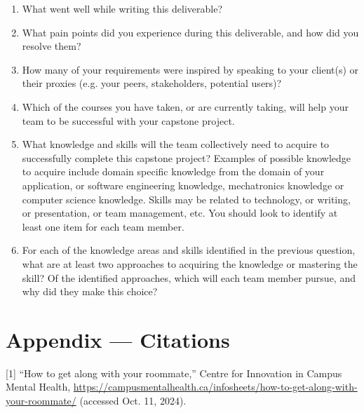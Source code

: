 \documentclass{scrreprt}
\theoremstyle{definition}
\begin{document}
\begin{enumerate}
  \item What went well while writing this deliverable? 
  \item What pain points did you experience during this deliverable, and how did
  you resolve them?
  \item How many of your requirements were inspired by speaking to your
  client(s) or their proxies (e.g. your peers, stakeholders, potential users)?
  \item Which of the courses you have taken, or are currently taking, will help
  your team to be successful with your capstone project.
  \item What knowledge and skills will the team collectively need to acquire to
  successfully complete this capstone project?  Examples of possible knowledge
  to acquire include domain specific knowledge from the domain of your
  application, or software engineering knowledge, mechatronics knowledge or
  computer science knowledge.  Skills may be related to technology, or writing,
  or presentation, or team management, etc.  You should look to identify at
  least one item for each team member.
  \item For each of the knowledge areas and skills identified in the previous
  question, what are at least two approaches to acquiring the knowledge or
  mastering the skill?  Of the identified approaches, which will each team
  member pursue, and why did they make this choice?
\end{enumerate}

\newpage{}
\section*{Appendix --- Citations}
[1] “How to get along with your roommate,” Centre for Innovation in Campus Mental Health, \href{https://campusmentalhealth.ca/infosheets/how-to-get-along-with-your-roommate/}{https://campusmentalhealth.ca/infosheets/how-to-get-along-with-your-roommate/} (accessed Oct. 11, 2024).

\end{document}
